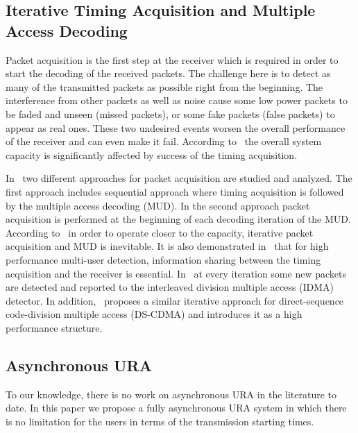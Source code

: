 \documentclass[journal,onecolumn,12pt]{IEEEtran}
\begin{document}
\subsection{Iterative Timing Acquisition and Multiple Access Decoding}
Packet acquisition is the first step at the  receiver which is required in order to start the decoding of the received packets. The challenge here is to detect as many of the transmitted packets as possible right from the beginning. The interference from other packets as well as noise cause some low power packets to be faded and unseen (missed packets), or some fake packets (false packets) to appear as real ones. These two undesired events worsen the overall performance of the receiver and can even make it fail. According to~\cite{CD94} the overall system capacity is significantly affected by success of the timing acquisition. 

In~\cite{T14} two different approaches for packet acquisition are studied and analyzed. The first approach includes sequential approach where timing acquisition is followed by the multiple access decoding (MUD). In the second approach packet acquisition is performed at the beginning of each decoding iteration of the MUD. According to~\cite{T14} in order to operate closer to the capacity,  iterative packet acquisition and MUD is inevitable. It is also demonstrated in~\cite{SRS08} that for high performance multi-user detection, information sharing between the timing acquisition and the receiver is essential. In~\cite{SRS08} at every iteration some new packets are detected and reported to the interleaved division multiple access (IDMA) detector. In addition,~\cite{RHC08} proposes a similar iterative approach for direct-sequence code-division multiple access (DS-CDMA) and introduces it as a high performance structure. \\

\subsection{Asynchronous URA}
To our knowledge, there is no work on asynchronous URA in the literature to date. In this paper we propose a fully asynchronous URA system in which there is no limitation for the users in terms of the transmission starting times. 
\end{document}
